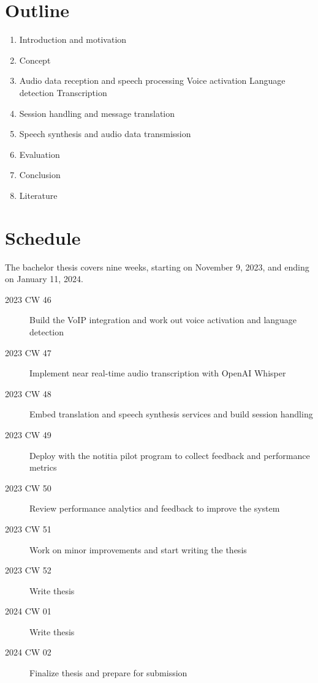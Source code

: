 \documentclass[a4paper,10pt]{article}
\begin{document}
\section{Outline}
\begin{enumerate}
  \item Introduction and motivation
  \item Concept
  \item Audio data reception and speech processing
  \subitem Voice activation
  \subitem Language detection
  \subitem Transcription
  \item Session handling and message translation
  \item Speech synthesis and audio data transmission
  \item Evaluation
  \item Conclusion
  \item Literature
\end{enumerate}


\section{Schedule}
The bachelor thesis covers nine weeks, starting on November 9, 2023, and ending on January 11, 2024.
\begin{description}
  \item[2023 CW 46] Build the VoIP integration and work out voice activation and language detection
  \item[2023 CW 47] Implement near real-time audio transcription with OpenAI Whisper
  \item[2023 CW 48] Embed translation and speech synthesis services and build session handling
  \item[2023 CW 49] Deploy with the notitia pilot program to collect feedback and performance metrics
  \item[2023 CW 50] Review performance analytics and feedback to improve the system
  \item[2023 CW 51] Work on minor improvements and start writing the thesis
  \item[2023 CW 52] Write thesis
  \item[2024 CW 01] Write thesis
  \item[2024 CW 02] Finalize thesis and prepare for submission
\end{description}


% 
% 
\end{document}
